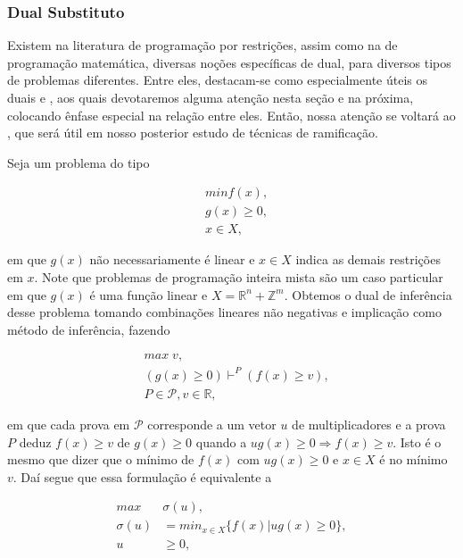 \documentclass{article}
\begin{document}
\subsubsection{Dual Substituto}

Existem na literatura de programação por restrições, assim como na de programação matemática,
diversas noções específicas de dual, para diversos tipos de problemas diferentes. Entre eles, destacam-se
como especialmente úteis os duais  e , aos quais devotaremos alguma atenção
nesta seção e na próxima, colocando ênfase especial na relação entre eles. Então, nossa atenção se
voltará ao , que será útil em nosso posterior estudo de técnicas de
ramificação.

Seja um problema do tipo

\begin{equation}
  \begin{split}
    & min f(x),\\
    & g(x) \geq 0,\\
    & x \in X,
  \end{split}\label{eqt:geral}
\end{equation}

\noindent em que $g(x)$ não necessariamente é linear e  $x \in X$ indica as demais restrições em $x$. Note
que problemas de programação inteira mista são um caso particular em que $g(x)$ é uma função linear e $X =
\mathbb{R}^n + \mathbb{Z}^m$. Obtemos o dual de inferência desse problema tomando combinações
lineares não negativas e implicação como método de inferência, fazendo

\begin{equation}
  \begin{split}
    & max \; v,\\
    & (g(x) \geq 0) \vdash^P (f(x) \geq v),\\
    & P \in \mathcal{P}, v \in \mathbb{R},
  \end{split}\label{eqt:surro}
\end{equation}

\noindent em que cada prova em $\mathcal{P}$ corresponde a um vetor $u$ de multiplicadores e a prova
$P$ deduz $f(x) \geq v$ de $g(x) \geq 0$ quando a $ug(x) \geq 0 \Rightarrow f(x) \geq
v$. Isto é o mesmo que dizer que o mínimo de $f(x)$ com $ug(x) \geq 0$ e $x \in X$ é no mínimo $v$.
Daí segue que essa formulação é equivalente a

\begin{align*}
  max \;& \sigma(u),\\
  \sigma(u) &= min_{x\in X}\{f(x)|ug(x)\geq0\},\\
  u &\geq 0,
\end{align*}
\end{document}
